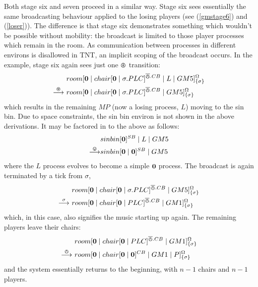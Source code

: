Both stage six and seven proceed in a similar way.  Stage six sees
essentially the same broadcasting behaviour applied to the losing
players (see (\ref{gmstage6}) and (\ref{loser})).  The difference is
that stage six demonstrates something which wouldn't be possible without
mobility: the broadcast is limited to those player processes which
remain in the room.  As communication between processes in different
environs is disallowed in TNT, an implicit scoping of the broadcast
occurs.  In the example, stage six again sees just one $\varoast$
transition:
\begin{equation}
\begin{aligned}
&  {room}[ \textbf{0} \;|\; {chair}[ \textbf{0} \;|\; \sigma.PLC ]^{\overline{\varowedge}.CB} \;|\; 
   L \;|\;
   GM5 ]^{\Omega}_{\{\sigma\}} \\
\stackrel{\varoast}{\longrightarrow}\ & {room}[ \textbf{0} \;|\; {chair}[ \textbf{0} \;|\; \sigma.PLC ]^{\overline{\varowedge}.CB} \;|\;
   GM5 ]^{\Omega}_{\{\sigma\}} \\
\end{aligned}
\end{equation}
which results in the remaining $MP$ (now a losing process, $L$) moving
to the sin bin.  Due to space constraints, the sin bin environ is not
shown in the above derivations.  It may be factored in to the above as
follows:
\begin{equation}
\begin{aligned}
& {sinbin}[ \textbf{0} ]^{SB} \;|\; L \;|\; GM5 \\
\stackrel{\varovee}{\longrightarrow} & {sinbin}[ \textbf{0} \;|\; \textbf{0} ]^{SB} \;|\; GM5
\end{aligned}
\end{equation}
 where the $L$ process evolves to become a simple $\textbf{0}$
process.  The broadcast is again terminated by a tick from $\sigma$,
\begin{equation}
\begin{aligned}
&  {room}[ \textbf{0} \;|\; {chair}[ \textbf{0} \;|\; \sigma.PLC ]^{\overline{\varowedge}.CB} \;|\;
   GM5 ]^{\Omega}_{\{\sigma\}} \\
\stackrel{\sigma}{\longrightarrow}\ & {room}[ \textbf{0} \;|\; {chair}[ \textbf{0} \;|\; PLC ]^{\overline{\varowedge}.CB} \;|\;
   GM1 ]^{\Omega}_{\{\sigma\}} 
\end{aligned}
\end{equation}
which, in this case, also signifies the music starting up again.  The
remaining players leave their chairs:
\begin{equation}
\begin{aligned}
& {room}[ \textbf{0} \;|\; {chair}[ \textbf{0} \;|\; PLC ]^{\overline{\varowedge}.CB} \;|\;
   GM1 ]^{\Omega}_{\{\sigma\}}   \\
\stackrel{\varowedge}{\longrightarrow}\ & {room}[ \textbf{0} \;|\; {chair}[ \textbf{0} \;|\; \textbf{0} ]^{CB} \;|\;
   GM1 \;|\; P ]^{\Omega}_{\{\sigma\}} 
\end{aligned}
\end{equation}
and the system essentially returns to the beginning, with $n -
1$ chairs and $n - 1$ players.

